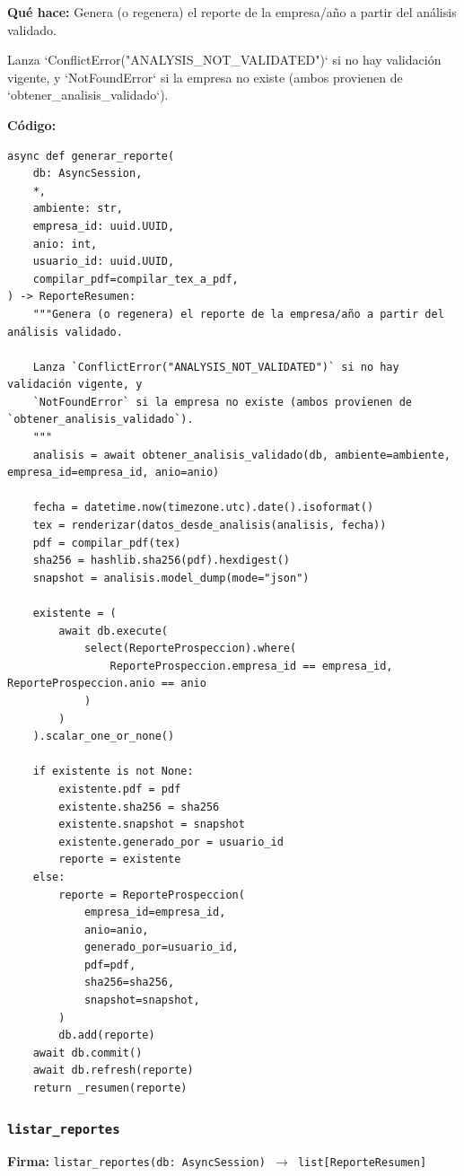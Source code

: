 \documentclass[11pt,a4paper]{article}
\begin{document}
\textbf{Qué hace:} Genera (o regenera) el reporte de la empresa/año a partir del análisis validado.

Lanza `ConflictError("ANALYSIS\_NOT\_VALIDATED")` si no hay validación vigente, y
`NotFoundError` si la empresa no existe (ambos provienen de `obtener\_analisis\_validado`).

\textbf{Código:}
\begin{lstlisting}
async def generar_reporte(
    db: AsyncSession,
    *,
    ambiente: str,
    empresa_id: uuid.UUID,
    anio: int,
    usuario_id: uuid.UUID,
    compilar_pdf=compilar_tex_a_pdf,
) -> ReporteResumen:
    """Genera (o regenera) el reporte de la empresa/año a partir del análisis validado.

    Lanza `ConflictError("ANALYSIS_NOT_VALIDATED")` si no hay validación vigente, y
    `NotFoundError` si la empresa no existe (ambos provienen de `obtener_analisis_validado`).
    """
    analisis = await obtener_analisis_validado(db, ambiente=ambiente, empresa_id=empresa_id, anio=anio)

    fecha = datetime.now(timezone.utc).date().isoformat()
    tex = renderizar(datos_desde_analisis(analisis, fecha))
    pdf = compilar_pdf(tex)
    sha256 = hashlib.sha256(pdf).hexdigest()
    snapshot = analisis.model_dump(mode="json")

    existente = (
        await db.execute(
            select(ReporteProspeccion).where(
                ReporteProspeccion.empresa_id == empresa_id, ReporteProspeccion.anio == anio
            )
        )
    ).scalar_one_or_none()

    if existente is not None:
        existente.pdf = pdf
        existente.sha256 = sha256
        existente.snapshot = snapshot
        existente.generado_por = usuario_id
        reporte = existente
    else:
        reporte = ReporteProspeccion(
            empresa_id=empresa_id,
            anio=anio,
            generado_por=usuario_id,
            pdf=pdf,
            sha256=sha256,
            snapshot=snapshot,
        )
        db.add(reporte)
    await db.commit()
    await db.refresh(reporte)
    return _resumen(reporte)
\end{lstlisting}

\subsubsection*{\texttt{listar\_reportes}}
\textbf{Firma:} \texttt{listar\_reportes(db: AsyncSession) $\rightarrow$ list[ReporteResumen]}
\end{document}
